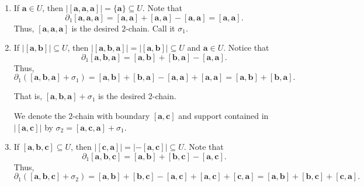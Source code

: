 \documentclass[12 pt, letterpaper]{hmcpset}
\begin{document}
\begin{solution}
	\begin{enumerate}
		\item If $\mathbf{a} \in U$, then $\lvert [\mathbf{a}, \mathbf{a}, \mathbf{a}] \rvert = \{ \mathbf{a} \} \subseteq U$. Note that
			\[
				\partial_{1} [\mathbf{a}, \mathbf{a}, \mathbf{a}] = [\mathbf{a}, \mathbf{a}] + [\mathbf{a}, \mathbf{a}] - [\mathbf{a}, \mathbf{a}] = [\mathbf{a}, \mathbf{a}].
			\]
			Thus, $[\mathbf{a}, \mathbf{a}, \mathbf{a}]$ is the desired $2$-chain. Call it $\sigma_{1}$.

		\item If $\lvert [\mathbf{a}, \mathbf{b}] \rvert \subseteq U$, then $\lvert [\mathbf{a}, \mathbf{b}, \mathbf{a}] \rvert = \lvert [\mathbf{a}, \mathbf{b}] \rvert \subseteq U$ and $\mathbf{a} \in U$. Notice that
			\[
				\partial_{1} [\mathbf{a}, \mathbf{b}, \mathbf{a}] = [\mathbf{a}, \mathbf{b}] + [\mathbf{b}, \mathbf{a}] - [\mathbf{a}, \mathbf{a}].
			\]
			Thus, 
			\[
				\partial_{1}([\mathbf{a}, \mathbf{b}, \mathbf{a}] + \sigma_{1}) = [\mathbf{a} , \mathbf{b}] + [\mathbf{b}, \mathbf{a}] - [\mathbf{a}, \mathbf{a}] + [\mathbf{a}, \mathbf{a}] = [\mathbf{a}, \mathbf{b}] + [\mathbf{b}, \mathbf{a}].
			\]

			That is, $[\mathbf{a}, \mathbf{b}, \mathbf{a}] + \sigma_{1}$ is the desired $2$-chain. 

			We denote the $2$-chain with boundary $[\mathbf{a}, \mathbf{c}]$ and support contained in $\lvert [\mathbf{a}, \mathbf{c}] \rvert$ by $\sigma_{2} = [\mathbf{a}, \mathbf{c}, \mathbf{a}] + \sigma_{1}$.

		\item If $[\mathbf{a}, \mathbf{b}, \mathbf{c}] \subseteq U$, then $\lvert [\mathbf{c}, \mathbf{a}] \rvert = \lvert -[\mathbf{a}, \mathbf{c}] \rvert \subseteq U$. Note that
			\[
				\partial_{1} [\mathbf{a}, \mathbf{b}, \mathbf{c}] = [\mathbf{a}, \mathbf{b}] + [\mathbf{b}, \mathbf{c}] - [\mathbf{a}, \mathbf{c}].
			\]
			Thus,
			\[
				\partial_{1}([\mathbf{a}, \mathbf{b}, \mathbf{c}] + \sigma_{2}) = [\mathbf{a}, \mathbf{b}] + [\mathbf{b}, \mathbf{c}] - [\mathbf{a}, \mathbf{c}] + [\mathbf{a}, \mathbf{c}] + [\mathbf{c}, \mathbf{a}] = [\mathbf{a}, \mathbf{b}] + [\mathbf{b}, \mathbf{c}] + [\mathbf{c}, \mathbf{a}].
			\]
	\end{enumerate}
\end{solution}

\pagebreak
\end{document}
